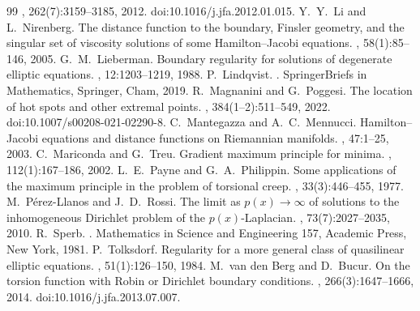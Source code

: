 \documentclass[11pt]{article}
\theoremstyle{definition}
\theoremstyle{remark}
\begin{document}
\begin{thebibliography}{99}
, 262(7):3159--3185, 2012.
\newblock doi:10.1016/j.jfa.2012.01.015.
 Y.\ Y.\ Li and L.\ Nirenberg.
\newblock The distance function to the boundary, Finsler geometry, and the singular set of viscosity solutions of some Hamilton--Jacobi equations.
, 58(1):85--146, 2005.
 G.\ M.\ Lieberman.
\newblock Boundary regularity for solutions of degenerate elliptic equations.
, 12:1203--1219, 1988.
 P.\ Lindqvist.
.
\newblock SpringerBriefs in Mathematics, Springer, Cham, 2019.
 R.\ Magnanini and G.\ Poggesi.
\newblock The location of hot spots and other extremal points.
, 384(1--2):511--549, 2022.
\newblock doi:10.1007/s00208-021-02290-8.
 C.\ Mantegazza and A.\ C.\ Mennucci.
\newblock Hamilton--Jacobi equations and distance functions on Riemannian manifolds.
, 47:1--25, 2003.
 C.\ Mariconda and G.\ Treu.
\newblock Gradient maximum principle for minima.
, 112(1):167--186, 2002.
 L.\ E.\ Payne and G.\ A.\ Philippin.
\newblock Some applications of the maximum principle in the problem of torsional creep.
, 33(3):446--455, 1977.
 M.\ P\'erez-Llanos and J.\ D.\ Rossi.
\newblock The limit as $p(x)\to\infty$ of solutions to the inhomogeneous Dirichlet problem of the $p(x)$-Laplacian.
, 73(7):2027--2035, 2010.
 R.\ Sperb.
.
\newblock Mathematics in Science and Engineering 157, Academic Press, New York, 1981.
 P.\ Tolksdorf.
\newblock Regularity for a more general class of quasilinear elliptic equations.
, 51(1):126--150, 1984.
 M.\ van den Berg and D.\ Bucur.
\newblock On the torsion function with Robin or Dirichlet boundary conditions.
, 266(3):1647--1666, 2014.
\newblock doi:10.1016/j.jfa.2013.07.007.
\end{thebibliography}
\end{document}
